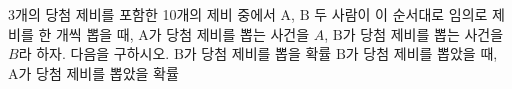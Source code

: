 3개의 당첨 제비를 포함한 10개의 제비 중에서 $\mathrm{A}$, $\mathrm{B}$ 두 사람이 이 순서대로 임의로 제비를 한 개씩 뽑을 때, $\mathrm{A}$가 당첨 제비를 뽑는 사건을 $A$, $\mathrm{B}$가 당첨 제비를 뽑는 사건을 $B$라 하자. 다음을 구하시오. 
 $\mathrm{B}$가 당첨 제비를 뽑을 확률
 $\mathrm{B}$가 당첨 제비를 뽑았을 때, $\mathrm{A}$가 당첨 제비를 뽑았을 확률

